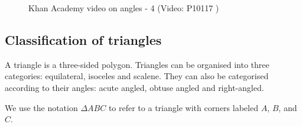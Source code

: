     \setcounter{subfigure}{0}
	\begin{figure}[H] %
    \textnormal{Khan Academy video on angles - 4}\vspace{.1in} \nopagebreak
  \label{m38380*yt-media4}\label{m38380*yt-video4}
             { (Video:  P10117
)}
      \vspace{2pt}
    \vspace{.1in}
 \end{figure}  
        \subsection*{Classification of triangles}
        \nopagebreak
        \label{m38380*id317485}A triangle is a three-sided polygon. Triangles can be organised into three categories: equilateral, isoceles and scalene. They can also be categorised according to their angles: acute angled, obtuse angled and right-angled. \par 
\label{m38380*id317683}We use the notation $\Delta ABC$ to
refer to a triangle with corners labeled \begin{math}A\end{math},
\begin{math}B\end{math}, and \begin{math}C\end{math}.\par 
